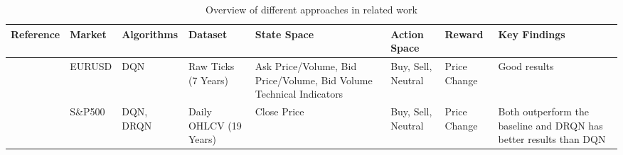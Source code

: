 \begin{landscape}
\begin{table}[htb!]
\caption{Overview of different approaches in related work}
\label{Tables:RelatedWork}
\centering
\footnotesize
\begin{tabularx}{\linewidth}{@{}clllXllX@{}}
\toprule
\textbf{Reference} & \textbf{Market} & \textbf{Algorithms} & \textbf{Dataset} & \textbf{State Space} & \textbf{Action Space} & \textbf{Reward} & \textbf{Key Findings} \\ 
\midrule
\cite{carapuco_2018} & EURUSD & DQN & Raw Ticks (7 Years) & Ask Price/Volume, Bid Price/Volume, Bid Volume Technical Indicators & Buy, Sell, Neutral & Price Change & Good results \\
\addlinespace
\cite{chen_2019} & S\&P500 & DQN, DRQN & Daily OHLCV (19 Years) & Close Price & Buy, Sell, Neutral & Price Change & Both outperform the baseline and DRQN has better results than DQN \\
\bottomrule
\end{tabularx}
\end{table}
\end{landscape}
